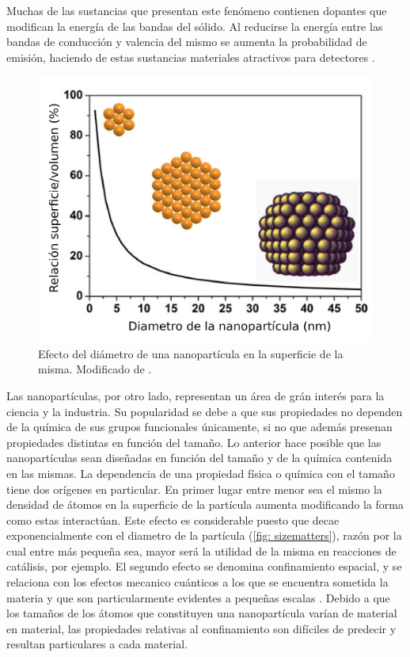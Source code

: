\documentclass[fleqn,10pt]{SelfArx}
\begin{document}
Muchas de las sustancias que presentan este fen\'omeno contienen dopantes que modifican la energ\'ia de las bandas del s\'olido. Al reducirse la energ\'ia entre las bandas de conducci\'on y valencia del mismo se aumenta la probabilidad de emisi\'on, haciendo de estas sustancias materiales atractivos para detectores \cite{sage_humberstone_oswald_lloyd_bourhill_2001} \cite{olawale_okoli_fontenot_hollerman_2016}.

\pagebreak
\begin{figure}[h]
	\centering
	\includegraphics[width=0.8\linewidth]{Structures/nanosizes.png}
	\caption{Efecto del di\'ametro de una nanopart\'icula en la superficie de la misma. Modificado de \cite{de_mello_donega_2014}.}
	\label{fig: sizematters}
\end{figure}
Las nanopart\'iculas, por otro lado, representan un \'area de gr\'an inter\'es para la ciencia y la industria. Su popularidad se debe a que sus propiedades no dependen de la qu\'imica de sus grupos funcionales \'unicamente, si no que adem\'as presenan propiedades distintas en funci\'on del tama\~no. Lo anterior hace posible que las nanopart\'iculas sean dise\~nadas en funci\'on del tama\~no y de la qu\'imica contenida en las mismas. La dependencia de una propiedad f\'isica o qu\'imica con el tama\~no tiene dos or\'igenes en particular. En primer lugar entre menor sea el mismo la densidad de \'atomos en la superficie de la part\'icula aumenta modificando la forma como estas interact\'uan. Este efecto es considerable puesto que decae exponencialmente con el diametro de la part\'icula (\autoref{fig: sizematters}), raz\'on por la cual entre m\'as peque\~na sea, mayor ser\'a la utilidad de la misma en reacciones de cat\'alisis, por ejemplo. El segundo efecto se denomina confinamiento espacial, y se relaciona con los efectos mecanico cu\'anticos a los que se encuentra sometida la materia y que son particularmente evidentes a peque\~nas escalas \cite{de_mello_donega_2014}. Debido a que los tama\~nos de los \'atomos que constituyen una nanopart\'icula var\'ian de material en material, las propiedades relativas al confinamiento son dif\'iciles de predecir y resultan particulares a cada material.
\end{document}
